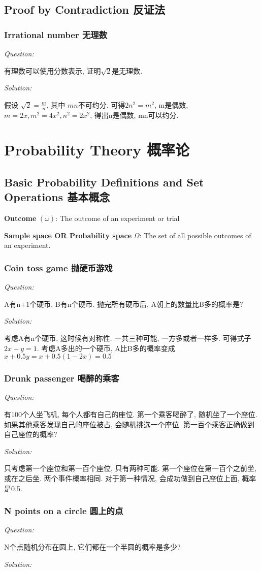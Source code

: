 \documentclass[12pt]{book}
\begin{document}
\section{Proof by Contradiction 反证法}
\subsection{Irrational number 无理数}
\noindent \textit{Question:}

有理数可以使用分数表示, 证明$\sqrt{2}$是无理数.

 \noindent \textit{Solution:} 
 
 假设 $\sqrt{2}=\frac{m}{n}$, 其中 $mn $不可约分. 可得$2n^2=m^2$, m是偶数, $m=2x, m^2=4x^2, n^2=2x^2$, 得出n是偶数, mn可以约分.
 
  
\chapter{Probability Theory 概率论}
\section{Basic Probability Definitions and Set Operations 基本概念}

\textbf{Outcome} $(\omega)$: The outcome of an experiment or trial

\textbf{Sample space OR Probability space} $\Omega$: The set of all possible outcomes of an experiment.

\subsection{Coin toss game 抛硬币游戏}
\noindent \textit{Question:}

A有n+1个硬币, B有n个硬币. 抛完所有硬币后, A朝上的数量比B多的概率是?

 \noindent \textit{Solution:} 
 
 考虑A有n个硬币, 这时候有对称性. 一共三种可能, 一方多或者一样多. 可得式子 $2x+y=1$. 考虑A多出的一个硬币, A比B多的概率变成 $x+0.5y=x+0.5(1-2x)=0.5$

\subsection{Drunk passenger 喝醉的乘客}
\noindent \textit{Question:}

有100个人坐飞机, 每个人都有自己的座位. 第一个乘客喝醉了, 随机坐了一个座位. 如果其他乘客发现自己的座位被占, 会随机挑选一个座位. 第一百个乘客正确做到自己座位的概率?

 \noindent \textit{Solution:} 
 
 只考虑第一个座位和第一百个座位, 只有两种可能. 第一个座位在第一百个之前坐, 或在之后坐. 两个事件概率相同. 对于第一种情况, 会成功做到自己座位上面, 概率是0.5.
 
 \subsection{N points on a circle 圆上的点}
\noindent \textit{Question:}


N个点随机分布在圆上, 它们都在一个半圆的概率是多少?

 \noindent \textit{Solution:} 
 
 
\end{document}
